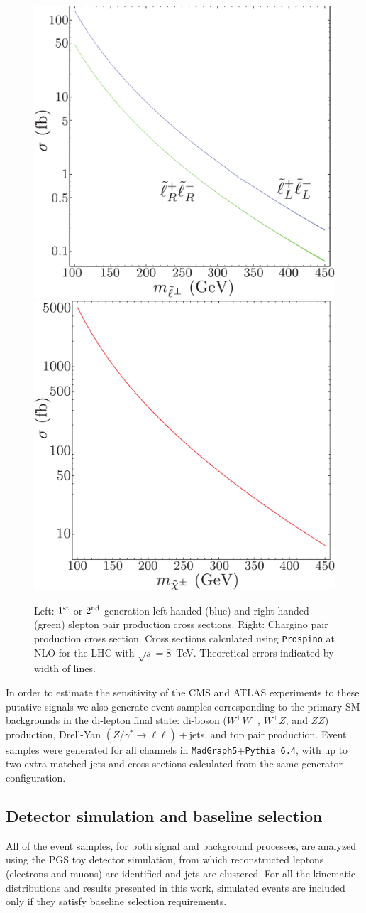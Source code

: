 \begin{figure}[ht]
\includegraphics[width=0.29\columnwidth]{fig/sectionIII/sleptonxs2.pdf}\hspace{5em}\includegraphics[width=0.3\columnwidth]{fig/sectionIII/charginoxs2.pdf} 
\caption{Left: $1^{\rm st}$ or $2^{\rm nd}$ generation left-handed (blue) and right-handed (green) slepton pair production cross sections. Right: Chargino pair production cross section. Cross sections calculated using {\tt Prospino} \cite{Beenakker:1999xh} at NLO for the LHC with $\sqrt{s}=8$~TeV. Theoretical errors indicated by width of lines. \label{fig:sigma}}
\end{figure}

In order to estimate the sensitivity of the CMS and ATLAS experiments to these putative signals we also generate event samples corresponding to the primary SM backgrounds in the di-lepton final state: di-boson ($W^+W^-$, $W^\pm Z$, and $ZZ$) production, Drell-Yan $(Z/\gamma^*\to\ell\ell)+$jets, and top pair production. Event samples were generated for all channels in {\tt MadGraph5}+{\tt Pythia 6.4},
with up to two extra matched jets and cross-sections calculated from the same generator configuration. 

\subsection{Detector simulation and baseline selection~\label{sec:baseline}}

All of the event samples, for both signal and background processes, are analyzed using the PGS toy detector simulation, from which reconstructed leptons (electrons and muons) are identified and jets are clustered. For all the kinematic distributions and results presented in this work, simulated events are included only if they satisfy baseline selection requirements. 


